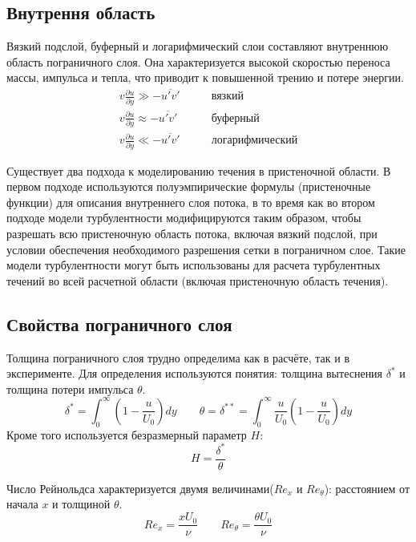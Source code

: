 \subsection{Внутрення область}

	Вязкий подслой, буферный и логарифмический слои составляют внутреннюю область пограничного слоя. Она характеризуется высокой скоростью переноса массы, импульса и тепла, что приводит к повышенной трению и потере энергии.
	\begin{align}
		v\frac{\partial u}{\partial y} \gg -\overline{u'v'} & \qquad\text{вязкий}\nonumber \\
		v\frac{\partial u}{\partial y} \approx -\overline{u'v'} & \qquad\text{буферный}\nonumber \\
		v\frac{\partial u}{\partial y} \ll -\overline{u'v'} & \qquad\text{логарифмический}
	\end{align}
	
	Существует два подхода к моделированию течения в пристеночной области. В первом подходе используются полуэмпирические формулы (пристеночные функции) для описания внутреннего слоя потока, в то время как во втором подходе модели турбулентности модифицируются таким образом, чтобы разрешать всю пристеночную область потока, включая вязкий подслой, при условии обеспечения необходимого разрешения сетки в пограничном слое. Такие модели турбулентности могут быть использованы для расчета турбулентных течений во всей расчетной области (включая пристеночную область течения).

\subsection{Свойства пограничного слоя}
	
	Толщина пограничного слоя трудно определима как в расчёте, так и в эксперименте. Для определения используются понятия: толщина вытеснения $\delta^*$ и толщина потери импульса $\theta$.
	\begin{equation}
		\delta^* = \int_{0}^{\infty}(1 - \frac{u}{U_0})dy \qquad \theta = \delta^{**} = \int_{0}^{\infty} \frac{u}{U_0}(1 - \frac{u}{U_0})dy
	\end{equation}
	Кроме того используется безразмерный параметр $H$:
	\begin{equation}
		H = \frac{\delta^*}{\theta}
	\end{equation}
	
	Число Рейнольдса характеризуется двумя величинами($Re_x$ и $Re_\theta$): расстоянием от начала $x$ и толщиной $\theta$.
	\begin{equation}
		Re_x = \frac{xU_0}{\nu} \qquad Re_\theta = \frac{\theta U_0}{\nu}
	\end{equation}
	
